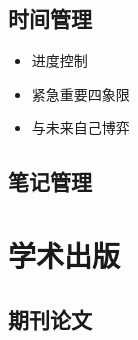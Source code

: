 \documentclass[]{tufte-book}
\providecommand{\tightlist}{%
  \setlength{\itemsep}{0pt}\setlength{\parskip}{0pt}}
\begin{document}
\hypertarget{ux65f6ux95f4ux7ba1ux7406}{%
\subsection{时间管理}\label{ux65f6ux95f4ux7ba1ux7406}}

\begin{itemize}
\tightlist
\item
  进度控制
\item
  紧急重要四象限
\item
  与未来自己博弈
\end{itemize}

\hypertarget{ux7b14ux8bb0ux7ba1ux7406}{%
\subsection{笔记管理}\label{ux7b14ux8bb0ux7ba1ux7406}}

\hypertarget{ux5b66ux672fux51faux7248}{%
\section{学术出版}\label{ux5b66ux672fux51faux7248}}

\hypertarget{ux671fux520aux8bbaux6587}{%
\subsection{期刊论文}\label{ux671fux520aux8bbaux6587}}
\end{document}
